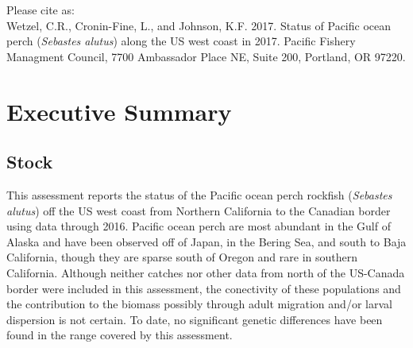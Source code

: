 \documentclass[12pt,]{article}
\begin{document}
\begin{center}
\vspace{.3cm}

\newpage

\vspace{3cm}

Please cite as:\\

Wetzel, C.R., Cronin-Fine, L., and Johnson, K.F. 2017. Status of Pacific ocean perch (\textit{Sebastes alutus}) along the US west coast in 2017. Pacific Fishery Managment Council, 7700 Ambassador Place NE, Suite 200, Portland, OR 97220. 

\vspace{3cm}

\maketitle






\setcounter{page}{1}
\end{center}

{
\setcounter{tocdepth}{4}
\tableofcontents
}
\setlength{\parskip}{5mm plus1mm minus1mm} \pagebreak

\setcounter{page}{1} \renewcommand{\thefigure}{\alph{figure}}
\renewcommand{\thetable}{\alph{table}}

\section*{Executive Summary}\label{executive-summary}

\subsection*{Stock}\label{stock}

This assessment reports the status of the Pacific ocean perch rockfish
(\emph{Sebastes alutus}) off the US west coast from Northern California
to the Canadian border using data through 2016. Pacific ocean perch are
most abundant in the Gulf of Alaska and have been observed off of Japan,
in the Bering Sea, and south to Baja California, though they are sparse
south of Oregon and rare in southern California. Although neither
catches nor other data from north of the US-Canada border were included
in this assessment, the conectivity of these populations and the
contribution to the biomass possibly through adult migration and/or
larval dispersion is not certain. To date, no significant genetic
differences have been found in the range covered by this assessment.
\end{document}
